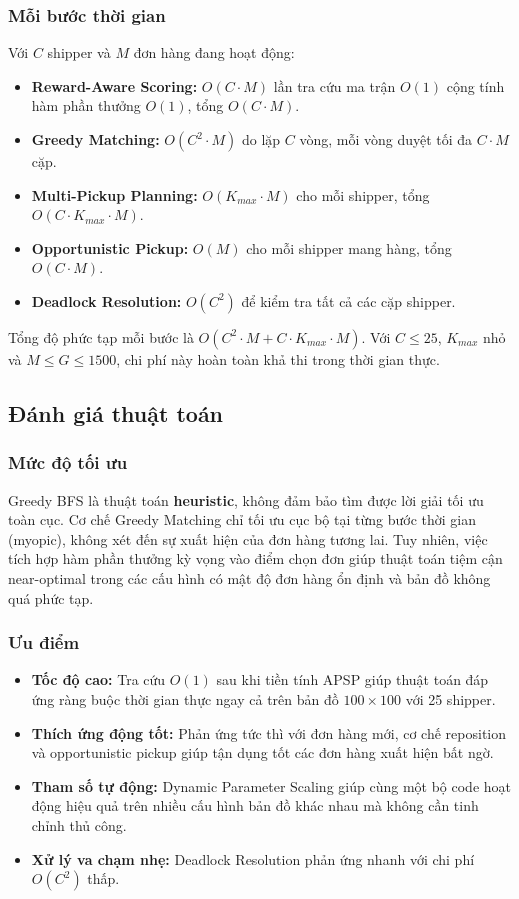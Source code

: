 \documentclass[conference]{IEEEtran}
\begin{document}
\subsubsection{Mỗi bước thời gian}
Với $C$ shipper và $M$ đơn hàng đang hoạt động:
\begin{itemize}
    \item \textbf{Reward-Aware Scoring:} $O(C \cdot M)$ lần tra cứu ma trận $O(1)$ cộng tính hàm phần thưởng $O(1)$, tổng $O(C \cdot M)$.
    \item \textbf{Greedy Matching:} $O(C^2 \cdot M)$ do lặp $C$ vòng, mỗi vòng duyệt tối đa $C \cdot M$ cặp.
    \item \textbf{Multi-Pickup Planning:} $O(K_{max} \cdot M)$ cho mỗi shipper, tổng $O(C \cdot K_{max} \cdot M)$.
    \item \textbf{Opportunistic Pickup:} $O(M)$ cho mỗi shipper mang hàng, tổng $O(C \cdot M)$.
    \item \textbf{Deadlock Resolution:} $O(C^2)$ để kiểm tra tất cả các cặp shipper.
\end{itemize}
Tổng độ phức tạp mỗi bước là $O(C^2 \cdot M + C \cdot K_{max} \cdot M)$. Với $C \le 25$, $K_{max}$ nhỏ và $M \le G \le 1500$, chi phí này hoàn toàn khả thi trong thời gian thực.

\subsection{Đánh giá thuật toán}
 
\subsubsection{Mức độ tối ưu}
Greedy BFS là thuật toán \textbf{heuristic}, không đảm bảo tìm được lời giải tối ưu toàn cục. Cơ chế Greedy Matching chỉ tối ưu cục bộ tại từng bước thời gian (myopic), không xét đến sự xuất hiện của đơn hàng tương lai. Tuy nhiên, việc tích hợp hàm phần thưởng kỳ vọng vào điểm chọn đơn giúp thuật toán tiệm cận near-optimal trong các cấu hình có mật độ đơn hàng ổn định và bản đồ không quá phức tạp.
 
\subsubsection{Ưu điểm}
\begin{itemize}
    \item \textbf{Tốc độ cao:} Tra cứu $O(1)$ sau khi tiền tính APSP giúp thuật toán đáp ứng ràng buộc thời gian thực ngay cả trên bản đồ $100 \times 100$ với 25 shipper.
    \item \textbf{Thích ứng động tốt:} Phản ứng tức thì với đơn hàng mới, cơ chế reposition và opportunistic pickup giúp tận dụng tốt các đơn hàng xuất hiện bất ngờ.
    \item \textbf{Tham số tự động:} Dynamic Parameter Scaling giúp cùng một bộ code hoạt động hiệu quả trên nhiều cấu hình bản đồ khác nhau mà không cần tinh chỉnh thủ công.
    \item \textbf{Xử lý va chạm nhẹ:} Deadlock Resolution phản ứng nhanh với chi phí $O(C^2)$ thấp.
\end{itemize}
 
\end{document}
